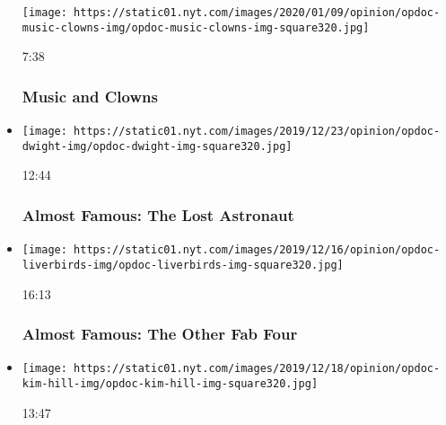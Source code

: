 \begin{itemize}
  \texttt{[image: https://static01.nyt.com/images/2020/01/09/opinion/opdoc-music-clowns-img/opdoc-music-clowns-img-square320.jpg]}

  7:38

  \hypertarget{music-and-clowns}{%
  \subsubsection{Music and Clowns}\label{music-and-clowns}}
\item
  \href{https://www.nytimes.com/video/opinion/100000006865864/almost-famous-the-lost-astronaut.html?action=click\&module=video-series-bar\&region=header\&pgtype=Article\&playlistId=video/op-docs}{}

  \texttt{[image: https://static01.nyt.com/images/2019/12/23/opinion/opdoc-dwight-img/opdoc-dwight-img-square320.jpg]}

  12:44

  \hypertarget{almost-famous-the-lost-astronaut}{%
  \subsubsection{Almost Famous: The Lost
  Astronaut}\label{almost-famous-the-lost-astronaut}}
\item
  \href{https://www.nytimes.com/video/opinion/100000006865876/almost-famous-the-other-fab-four.html?action=click\&module=video-series-bar\&region=header\&pgtype=Article\&playlistId=video/op-docs}{}

  \texttt{[image: https://static01.nyt.com/images/2019/12/16/opinion/opdoc-liverbirds-img/opdoc-liverbirds-img-square320.jpg]}

  16:13

  \hypertarget{almost-famous-the-other-fab-four}{%
  \subsubsection{Almost Famous: The Other Fab
  Four}\label{almost-famous-the-other-fab-four}}
\item
  \href{https://www.nytimes.com/video/opinion/100000006865878/almost-famous-kim-i-am.html?action=click\&module=video-series-bar\&region=header\&pgtype=Article\&playlistId=video/op-docs}{}

  \texttt{[image: https://static01.nyt.com/images/2019/12/18/opinion/opdoc-kim-hill-img/opdoc-kim-hill-img-square320.jpg]}

  13:47

  \hypertarget{almost-famous-kim-i-am}{%
}
\end{itemize}
